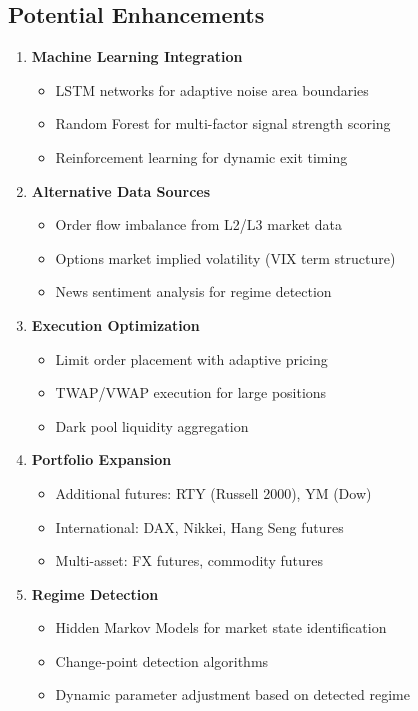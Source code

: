 \documentclass[twocolumn,ieee]{arithmaxresearch}
\begin{document}
\subsection{Potential Enhancements}

\begin{enumerate}
    \item \textbf{Machine Learning Integration}
    \begin{itemize}
        \item LSTM networks for adaptive noise area boundaries
        \item Random Forest for multi-factor signal strength scoring
        \item Reinforcement learning for dynamic exit timing
    \end{itemize}
    
    \item \textbf{Alternative Data Sources}
    \begin{itemize}
        \item Order flow imbalance from L2/L3 market data
        \item Options market implied volatility (VIX term structure)
        \item News sentiment analysis for regime detection
    \end{itemize}
    
    \item \textbf{Execution Optimization}
    \begin{itemize}
        \item Limit order placement with adaptive pricing
        \item TWAP/VWAP execution for large positions
        \item Dark pool liquidity aggregation
    \end{itemize}
    
    \item \textbf{Portfolio Expansion}
    \begin{itemize}
        \item Additional futures: RTY (Russell 2000), YM (Dow)
        \item International: DAX, Nikkei, Hang Seng futures
        \item Multi-asset: FX futures, commodity futures
    \end{itemize}
    
    \item \textbf{Regime Detection}
    \begin{itemize}
        \item Hidden Markov Models for market state identification
        \item Change-point detection algorithms
        \item Dynamic parameter adjustment based on detected regime
    \end{itemize}
\end{enumerate}
\end{document}
